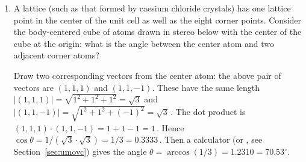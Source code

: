 \begin{example}
\begin{enumerate}
\item A  lattice (such as that formed by caesium chloride crystals) has one lattice point in the center of the unit cell as well as the eight corner points.
Consider the body-centered cube of atoms drawn in stereo below with the center of the cube at the origin: what is the angle between the center atom and two adjacent corner atoms?
\begin{center}
 {
}
\end{center}
\begin{solution} 
Draw two corresponding vectors from the center atom: the above pair of vectors are \((1,1,1)\) and \((1,1,-1)\).
These have the same length \(|(1,1,1)|=\sqrt{1^2+1^2+1^2}=\sqrt3\) and \(|(1,1,-1)|=\sqrt{1^2+1^2+(-1)^2}=\sqrt3\)\,.
The dot product is \((1,1,1)\cdot(1,1,-1)=1+1-1=1\)\,.
Hence \(\cos\theta=1/(\sqrt3\cdot\sqrt3)=1/3=0.3333\)\,.
Then a calculator (or \script, see Section~\ref{sec:umovc}) gives the angle \(\theta =\arccos(1/3) =1.2310 =70.53^\circ\).
\end{solution}
\end{enumerate}
\end{example}


 




